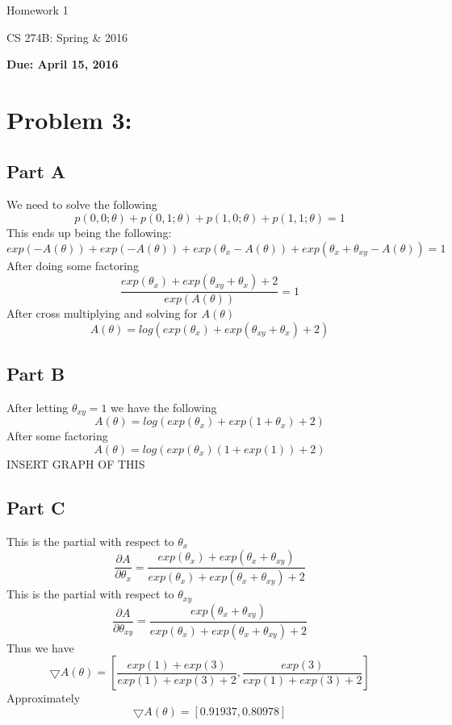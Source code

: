 \documentclass[twoside,11pt]{article}
\theoremstyle{definition}
\begin{document}
\centerline{\Large Homework 1}
\centerline{CS 274B: Spring \& 2016}
\centerline{\bf Due: April 15, 2016}


\section*{Problem 3: }

\subsection*{Part A}

We need to solve the following
\[
p(0,0;\theta) + p(0,1;\theta) + p(1,0;\theta) + p(1,1;\theta) = 1
\]
This ends up being the following:
\[
exp(-A(\theta)) + exp(-A(\theta)) + exp(\theta_x - A(\theta)) + exp(\theta_x + \theta_{xy} - A(\theta)) = 1
\]
After doing some factoring
\[
\frac{exp(\theta_x) + exp(\theta_{xy} + \theta_x) + 2}{exp(A(\theta))} = 1
\]
After cross multiplying and solving for $A(\theta)$
\[
A(\theta) = log( exp(\theta_x) + exp(\theta_{xy} + \theta_x) + 2 )
\]

\subsection*{Part B}
After letting $\theta_{xy} = 1$ we have the following
\[
A(\theta) = log( exp(\theta_x) + exp(1 + \theta_x) + 2 )
\]
After some factoring
\[
A(\theta) = log( exp(\theta_x)(1 + exp(1) ) + 2 )
\]
INSERT GRAPH OF THIS

\subsection*{Part C}
This is the partial with respect to $\theta_x$
\[
\frac{\partial A}{\partial \theta_x} = \frac{exp(\theta_x) + exp(\theta_x + \theta_{xy})}{exp(\theta_x) + exp(\theta_x + \theta_{xy}) + 2}
\]
This is the partial with respect to $\theta_{xy}$
\[
\frac{\partial A}{\partial \theta_{xy}} = \frac{exp(\theta_x + \theta_{xy})}{exp(\theta_x) + exp(\theta_x + \theta_{xy}) + 2}
\]
Thus we have 
\[
\bigtriangledown A(\theta) = [\frac{exp(1)+exp(3)}{exp(1)+exp(3)+2},\frac{exp(3)}{exp(1)+exp(3)+2}]
\]
Approximately 
\[
\bigtriangledown A(\theta) = [0.91937,0.80978]
\]
\end{document}
